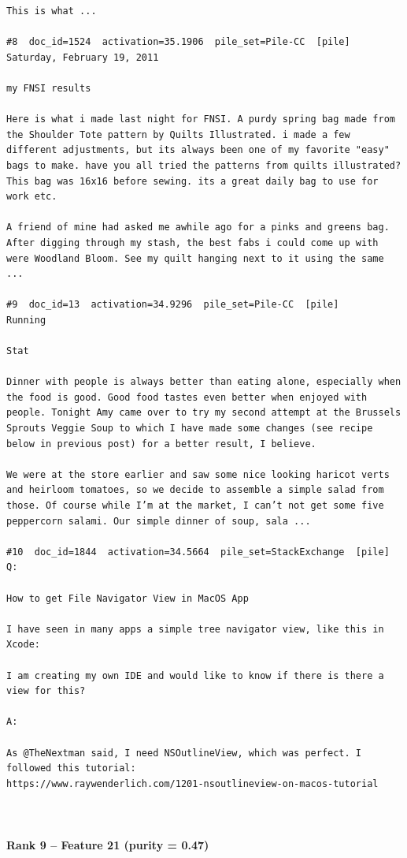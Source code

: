 \begin{verbatim}
This is what ...

#8  doc_id=1524  activation=35.1906  pile_set=Pile-CC  [pile]
Saturday, February 19, 2011

my FNSI results

Here is what i made last night for FNSI. A purdy spring bag made from the Shoulder Tote pattern by Quilts Illustrated. i made a few different adjustments, but its always been one of my favorite "easy" bags to make. have you all tried the patterns from quilts illustrated? This bag was 16x16 before sewing. its a great daily bag to use for work etc.

A friend of mine had asked me awhile ago for a pinks and greens bag. After digging through my stash, the best fabs i could come up with were Woodland Bloom. See my quilt hanging next to it using the same ...

#9  doc_id=13  activation=34.9296  pile_set=Pile-CC  [pile]
Running

Stat

Dinner with people is always better than eating alone, especially when the food is good. Good food tastes even better when enjoyed with people. Tonight Amy came over to try my second attempt at the Brussels Sprouts Veggie Soup to which I have made some changes (see recipe below in previous post) for a better result, I believe.

We were at the store earlier and saw some nice looking haricot verts and heirloom tomatoes, so we decide to assemble a simple salad from those. Of course while I’m at the market, I can’t not get some five peppercorn salami. Our simple dinner of soup, sala ...

#10  doc_id=1844  activation=34.5664  pile_set=StackExchange  [pile]
Q:

How to get File Navigator View in MacOS App

I have seen in many apps a simple tree navigator view, like this in Xcode:

I am creating my own IDE and would like to know if there is there a view for this?

A:

As @TheNextman said, I need NSOutlineView, which was perfect. I followed this tutorial:
https://www.raywenderlich.com/1201-nsoutlineview-on-macos-tutorial



\end{verbatim}

\paragraph*{Rank 9 -- Feature 21 (purity = 0.47)}

